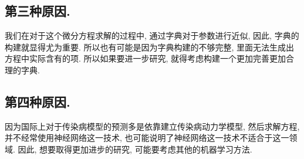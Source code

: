 \documentclass[lang=cn,11pt]{elegantpaper}
\begin{document}
\subsection*{第三种原因.}
我们在对于这个微分方程求解的过程中, 通过字典对于参数进行近似, 因此, 字典的构建就显得尤为重要. 所以也有可能是因为字典构建的不够完整, 里面无法生成出方程中实际含有的项. 所以如果要进一步研究, 就得考虑构建一个更加完善更加合理的字典.
\subsection*{第四种原因.}
因为国际上对于传染病模型的预测多是依靠建立传染病动力学模型, 然后求解方程, 并不经常使用神经网络这一技术, 也可能说明了神经网络这一技术不适合于这一领域. 因此, 想要取得更加进步的研究, 可能要考虑其他的机器学习方法.
\newpage


\end{document}
